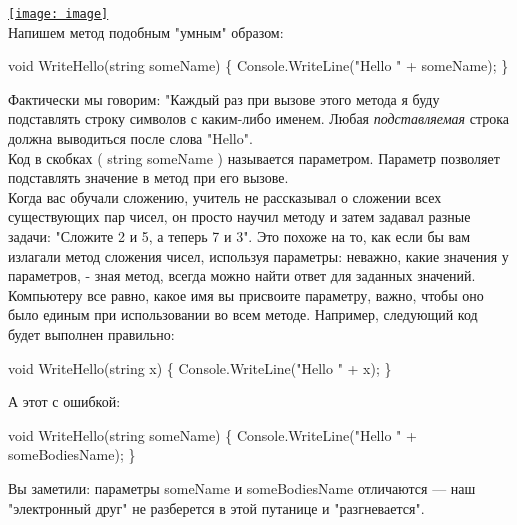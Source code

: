 \documentclass[12pt, a4paper]{article}
\begin{document}
\bigbreak \href{http://www.intuit.ru//EDI/25_09_16_1/1474755579-437/tutorial/590/objects/3/files/02-24.jpg}                         {\texttt{[image: image]}}\\



Напишем метод подобным "умным" образом:\\

\begin{spverbatim}void WriteHello(string someName)
\{
    Console.WriteLine("Hello " + someName);
\}\end{spverbatim}

Фактически мы говорим: "Каждый раз при вызове этого метода я буду подставлять строку символов с каким-либо именем. Любая \textit{подставляемая}  строка должна выводиться после слова "Hello".\\

Код в скобках ( string someName ) называется параметром. Параметр позволяет подставлять значение в метод при его вызове.\\

Когда вас обучали сложению, учитель не рассказывал о сложении всех существующих пар чисел, он просто научил методу и затем задавал разные задачи: "Сложите 2 и 5, а теперь 7 и 3". Это похоже на то, как если бы вам излагали метод сложения чисел, используя параметры: неважно, какие значения у параметров, - зная метод, всегда можно найти ответ для заданных значений.\\

Компьютеру все равно, какое имя вы присвоите параметру, важно, чтобы оно было единым при использовании во всем методе. Например, следующий код будет выполнен правильно:\\

\begin{spverbatim}void WriteHello(string x)
\{
    Console.WriteLine("Hello " + x);
\}\end{spverbatim}

А этот с ошибкой:\\

\begin{spverbatim}void WriteHello(string someName)
\{
    Console.WriteLine("Hello " + someBodiesName);
\}\end{spverbatim}

Вы заметили: параметры someName  и someBodiesName  отличаются — наш "электронный друг" не разберется в этой путанице и "разгневается".\\
\end{document}
